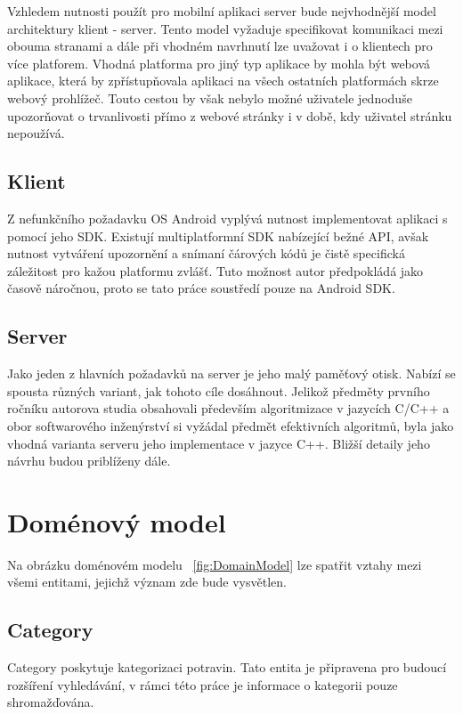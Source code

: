 \documentclass[thesis=B,czech]{FITthesis}[2013/10/20]
\begin{document}
Vzhledem nutnosti použít pro mobilní aplikaci server bude nejvhodnější model architektury klient - server. Tento model vyžaduje specifikovat komunikaci mezi obouma stranami a dále při vhodném navrhnutí lze uvažovat i o klientech pro více platforem. Vhodná platforma pro jiný typ aplikace by mohla být webová aplikace, která by zpřístupňovala aplikaci na všech ostatních platformách skrze webový prohlížeč. Touto cestou by však nebylo možné uživatele jednoduše upozorňovat o trvanlivosti přímo z webové stránky i v době, kdy uživatel stránku nepoužívá.

\subsection{Klient}

Z nefunkčního požadavku OS Android vyplývá nutnost implementovat aplikaci s pomocí jeho SDK. Existují multiplatformní SDK nabízející bežné API, avšak nutnost vytváření upozornění a snímaní čárových kódů je čistě specifická záležitost pro kažou platformu zvlášť. Tuto možnost autor předpokládá jako časově náročnou, proto se tato práce soustředí pouze na Android SDK.

\subsection{Server}

Jako jeden z hlavních požadavků na server je jeho malý paměťový otisk. Nabízí se spousta různých variant, jak tohoto cíle dosáhnout. Jelikož předměty prvního ročníku autorova studia obsahovali především algoritmizace v jazycích C/C++ a obor softwarového inženýrství si vyžádal předmět efektivních algoritmů, byla jako vhodná varianta serveru jeho implementace v jazyce C++. Bližší detaily jeho návrhu budou priblíženy dále.

\section{Doménový model}

Na obrázku doménovém modelu ~\ref{fig:DomainModel} lze spatřit vztahy mezi všemi entitami, jejichž význam zde bude vysvětlen.

\subsection{Category}
Category poskytuje kategorizaci potravin. Tato entita je připravena pro budoucí rozšíření vyhledávání, v rámci této práce je informace o kategorii pouze shromažďována. 
\end{document}
